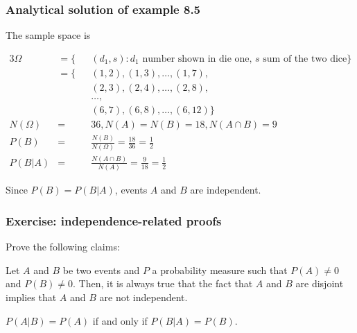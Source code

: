 \begin{frame}
    \frametitle{Analytical solution of example 8.5}

    \scriptsize
    The sample space is

    \begin{alignat*}{3}
        \Omega&=\{&&(d_1, s): d_1\text{ number shown in die one, }s\text{ sum of the two dice}\}\\
              &=\{&&(1,2),(1,3),\ldots,(1,7),\\
              &   &&(2,3),(2,4),\ldots,(2,8),\\
              &   &&\ldots,\\
              &   &&(6,7),(6,8),\ldots,(6,12)\}\\
        N(\Omega)&=&&36,N(A)=N(B)=18,N(A\cap B)=9\\
        P(B)&=     &&\frac{N(B)}{N(\Omega)}=\frac{18}{36}=\frac{1}{2}\\
        P(B|A)&=   &&\frac{N(A\cap B)}{N(A)}=\frac{9}{18}=\frac{1}{2}
    \end{alignat*}

    Since $P(B)=P(B|A)$, events $A$ and $B$ are independent.
    \normalsize
\end{frame}

\begin{frame}
    \frametitle{Exercise: independence-related proofs}

    Prove the following claims:

    \begin{claim*}

        Let $A$ and $B$ be two events and $P$ a probability measure such that
        $P(A)\ne 0$ and $P(B)\ne 0$. Then, it is always true that the fact that
        $A$ and $B$ are disjoint implies that $A$ and $B$ are not independent.

    \end{claim*}

    \begin{claim*}
        $P(A|B)=P(A)$ if and only if $P(B|A)=P(B)$.
    \end{claim*}
\end{frame}

